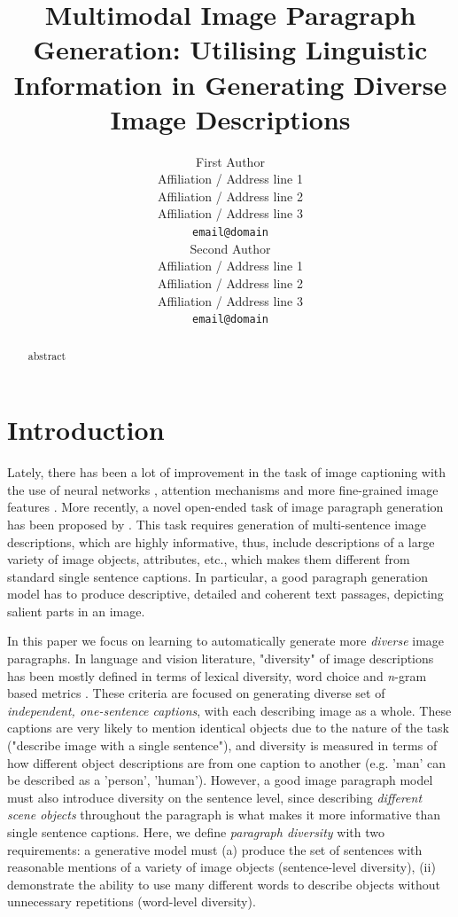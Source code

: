 \documentclass[11pt,a4paper]{article}
\title{Multimodal Image Paragraph Generation: Utilising Linguistic Information in Generating Diverse Image Descriptions}
\author{First Author \\
  Affiliation / Address line 1 \\
  Affiliation / Address line 2 \\
  Affiliation / Address line 3 \\
  \texttt{email@domain} \\\And
  Second Author \\
  Affiliation / Address line 1 \\
  Affiliation / Address line 2 \\
  Affiliation / Address line 3 \\
  \texttt{email@domain} \\}
\date{}
\begin{document}
\maketitle
\begin{abstract}
abstract

\end{abstract}

\section{Introduction}

Lately, there has been a lot of improvement in the task of image captioning \cite{bernardi2016automatic} with the use of neural networks  \cite{kiros14,vinyals2014tell}, attention mechanisms \cite{xu2015attend} and more fine-grained image features \cite{anderson2017bottomup}.
More recently, a novel open-ended task of image paragraph generation has been proposed by .
This task requires generation of multi-sentence image descriptions, which are highly informative, thus, include descriptions of a large variety of image objects, attributes, etc., which makes them different from standard single sentence captions.
In particular, a good paragraph generation model has to produce descriptive, detailed and coherent text passages, depicting salient parts in an image.

In this paper we focus on learning to automatically generate more \textit{diverse} image paragraphs.
In language and vision literature, "diversity" of image descriptions has been mostly defined in terms of lexical diversity, word choice and \textit{n}-gram based metrics \cite{Devlin2015, Vijayakumar2016, Lindh2018, VanMiltenburg2018}.
These criteria are focused on generating diverse set of \textit{independent, one-sentence captions}, with each describing image as a whole.
These captions are very likely to mention identical objects due to the nature of the task ("describe image with a single sentence"), and diversity is measured in terms of how different object descriptions are from one caption to another (e.g. 'man' can be described as a 'person', 'human').
However, a good image paragraph model must also introduce diversity on the sentence level, since describing \textit{different scene objects} throughout the paragraph is what makes it more informative than single sentence captions.
Here, we define \textit{paragraph diversity} with two requirements: a generative model must (a) produce the set of sentences with reasonable mentions of a variety of image objects (sentence-level diversity), (ii) demonstrate the ability to use many different words to describe objects without unnecessary repetitions (word-level diversity).
\end{document}
